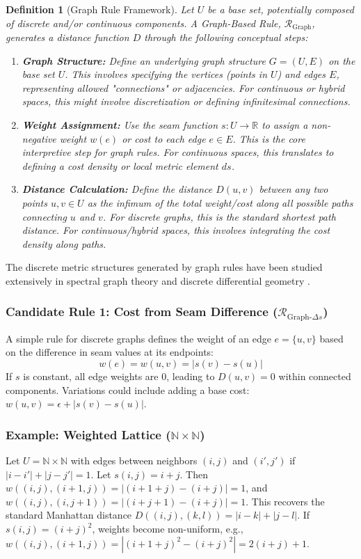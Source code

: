 \documentclass[twoside,twocolumn]{article}
\newtheorem{definition}{Definition}[subsection] %
\begin{document}
\begin{definition}[Graph Rule Framework]
Let $U$ be a base set, potentially composed of discrete and/or continuous components. A \emph{Graph-Based Rule}, $\mathcal{R}_{\text{Graph}}$, generates a distance function $D$ through the following conceptual steps:
\begin{enumerate}
    \item \textbf{Graph Structure:} Define an underlying graph structure $G = (U, E)$ on the base set $U$. This involves specifying the vertices (points in $U$) and edges $E$, representing allowed "connections" or adjacencies. For continuous or hybrid spaces, this might involve discretization or defining infinitesimal connections.
    \item \textbf{Weight Assignment:} Use the seam function $s: U \to \mathbb{R}$ to assign a non-negative weight $w(e)$ or cost to each edge $e \in E$. This is the core interpretive step for graph rules. For continuous spaces, this translates to defining a cost density or local metric element $ds$.
    \item \textbf{Distance Calculation:} Define the distance $D(u, v)$ between any two points $u, v \in U$ as the infimum of the total weight/cost along all possible paths connecting $u$ and $v$. For discrete graphs, this is the standard shortest path distance. For continuous/hybrid spaces, this involves integrating the cost density along paths.
\end{enumerate}
\end{definition}
The discrete metric structures generated by graph rules have been studied extensively in spectral graph theory \cite{Chung1997} and discrete differential geometry \cite{Bobenko2015}.

\subsubsection{Candidate Rule 1: Cost from Seam Difference ($\mathcal{R}_{\text{Graph-}\Delta s}$)}
A simple rule for discrete graphs defines the weight of an edge $e=\{u, v\}$ based on the difference in seam values at its endpoints:
$$ w(e) = w(u, v) = |s(v) - s(u)| $$
If $s$ is constant, all edge weights are 0, leading to $D(u,v)=0$ within connected components. Variations could include adding a base cost: $w(u, v) = \epsilon + |s(v) - s(u)|$.

\subsubsection{Example: Weighted Lattice ($\mathbb{N} \times \mathbb{N}$)}
Let $U = \mathbb{N} \times \mathbb{N}$ with edges between neighbors $(i, j)$ and $(i', j')$ if $|i-i'|+|j-j'|=1$. Let $s(i, j) = i + j$. Then $w((i,j), (i+1,j)) = |(i+1+j) - (i+j)| = 1$, and $w((i,j), (i,j+1)) = |(i+j+1) - (i+j)| = 1$. This recovers the standard Manhattan distance $D((i,j), (k,l)) = |i-k| + |j-l|$. If $s(i, j) = (i+j)^2$, weights become non-uniform, e.g., $w((i,j), (i+1,j)) = |(i+1+j)^2 - (i+j)^2| = 2(i+j)+1$.
\end{document}
